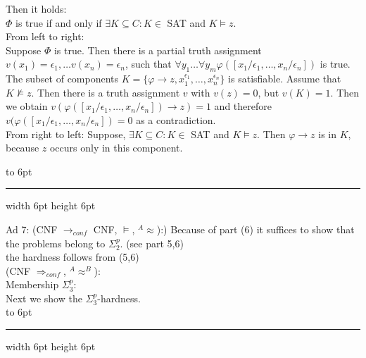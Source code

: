 \documentclass[12pt]{article}
\newcommand{\AEQB}{\mbox{$^A$\hspace{-0.5mm}$\approx^B$}}
\newcommand{\AEQ}{\mbox{$^A$\hspace{-0.5mm}$\approx$}}
\newenvironment{proof}{\parindent=0pt{\bf Proof: }}{
   \hspace*{\fill}\hbox to 6pt{\leaders\hrule width 6pt height 6pt\hfill}\par}
\begin{document}
\begin{proof}
Then it holds:\\
$\Phi$ is true if and only if $\exists K \subseteq C: K \in$ SAT and $K \models z$.\\
From left to right:\\
Suppose $\Phi$ is true. Then there is a partial truth assignment $v(x_1)= \epsilon_1, \ldots v(x_n)= \epsilon_n$, such
that $\forall y_1 \ldots \forall y_m \varphi([x_1/\epsilon_1, \ldots, x_n/\epsilon_n])$ is true. The subset of components
$K= \{ \varphi \rightarrow z, x_1^{\epsilon_1}, \ldots, x_n^{\epsilon_n}\}$ is satisfiable. Assume that $K\not \models z$.
Then there is a truth assignment $v$ with $v(z)=0$, but $v(K)=1$. Then we obtain $v(\varphi([x_1/\epsilon_1, \ldots, x_n/ \epsilon_n]) \rightarrow z)=1$ and therefore $v(\varphi([x_1/\epsilon_1, \ldots, x_n/ \epsilon_n])=0$ as a contradiction.\\

From right to left: Suppose, $\exists K \subseteq C: K \in$ SAT and $K \models z$. Then $\varphi \rightarrow z$ is in $K$,
because $z$ occurs only in this component.
\end{proof}

\vspace*{3mm}
\begin{proof}
Ad 7: (CNF $\longrightarrow_{conf}$ CNF, $\models$, \AEQ):)
Because of part (6) it suffices to show that the problems belong to $\Sigma_2^p$.
(see part 5,6)\\
the hardness follows from (5,6)\\

(CNF $\Longrightarrow_{conf}$, \AEQB):\\
Membership $\Sigma_3^p$:\\

Next we show the $\Sigma^p_3$-hardness.\\




\end{proof}
\end{document}
